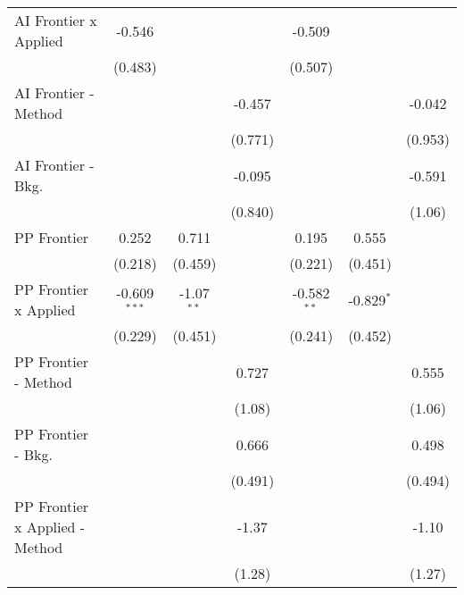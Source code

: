 \begin{tabular}{lcccccc}
   AI Frontier x Applied          & -0.546         &                &               & -0.509        &                &   \\   
                                  & (0.483)        &                &               & (0.507)       &                &   \\   
   AI Frontier - Method           &                &                & -0.457        &               &                & -0.042\\   
                                  &                &                & (0.771)       &               &                & (0.953)\\   
   AI Frontier - Bkg.             &                &                & -0.095        &               &                & -0.591\\   
                                  &                &                & (0.840)       &               &                & (1.06)\\   
   PP Frontier                    & 0.252          & 0.711          &               & 0.195         & 0.555          &   \\   
                                  & (0.218)        & (0.459)        &               & (0.221)       & (0.451)        &   \\   
   PP Frontier x Applied          & -0.609$^{***}$ & -1.07$^{**}$   &               & -0.582$^{**}$ & -0.829$^{*}$   &   \\   
                                  & (0.229)        & (0.451)        &               & (0.241)       & (0.452)        &   \\   
   PP Frontier - Method           &                &                & 0.727         &               &                & 0.555\\   
                                  &                &                & (1.08)        &               &                & (1.06)\\   
   PP Frontier - Bkg.             &                &                & 0.666         &               &                & 0.498\\   
                                  &                &                & (0.491)       &               &                & (0.494)\\   
   PP Frontier x Applied - Method &                &                & -1.37         &               &                & -1.10\\   
                                  &                &                & (1.28)        &               &                & (1.27)\\   

\end{tabular}
